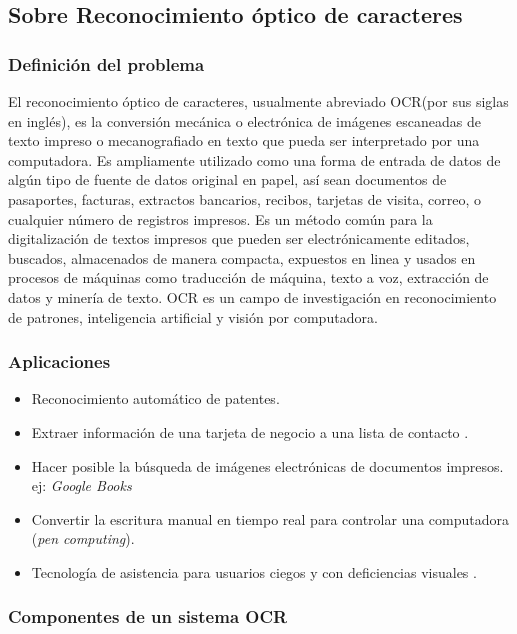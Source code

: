 \subsection{Sobre Reconocimiento óptico de caracteres}

	\subsubsection{Definición del problema}
	
	El reconocimiento óptico de caracteres, usualmente abreviado OCR(por sus siglas en inglés), es la conversión mecánica o electrónica de imágenes escaneadas de texto impreso o mecanografiado en texto que pueda ser interpretado por una computadora. Es ampliamente utilizado como una forma de entrada de datos de algún tipo de fuente de datos original en papel, así sean documentos de pasaportes, facturas, extractos bancarios, recibos, tarjetas de visita, correo, o cualquier número de registros impresos\cite{arh-passport}\cite{arh-card}. Es un método común para la digitalización de textos impresos que pueden ser electrónicamente editados, buscados, almacenados de manera compacta, expuestos en linea y usados en procesos de máquinas como traducción de máquina, texto a voz, extracción de datos y minería de texto\cite{gbook}\cite{creaceed}. OCR es un campo de investigación en reconocimiento de patrones, inteligencia artificial y visión por computadora.
	
	\subsubsection{Aplicaciones}
		\begin{itemize}
			\item Reconocimiento automático de patentes\cite{arh-anpr}.
			\item Extraer información de una tarjeta de negocio a una lista de contacto \cite{x-root}.
			\item Hacer posible la búsqueda de imágenes electrónicas de documentos impresos. ej: \textit{Google Books} \cite{gbook}
			\item Convertir la escritura manual en tiempo real para controlar una computadora (\textit{pen computing})\cite{GKurt}\cite{sunnyside}.
			\item Tecnología de asistencia para usuarios ciegos y con deficiencias visuales \cite{creaceed}.
		\end{itemize}	
		
	\subsubsection{Componentes de un sistema OCR}
	
